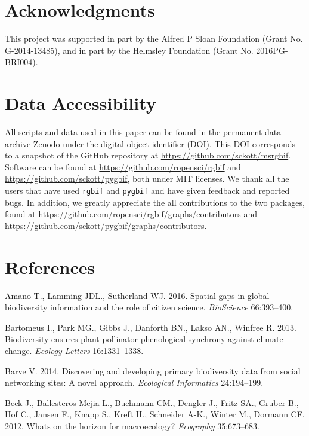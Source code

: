 \documentclass[author-year, review, 11pt]{components/elsarticle} %
\begin{document}
\section{Acknowledgments}\label{acknowledgments}

This project was supported in part by the Alfred P Sloan Foundation
(Grant No. G-2014-13485), and in part by the Helmsley Foundation (Grant
No. 2016PG-BRI004).

\section{Data Accessibility}\label{data-accessibility}

All scripts and data used in this paper can be found in the permanent
data archive Zenodo under the digital object identifier (DOI). This DOI
corresponds to a snapshot of the GitHub repository at
\url{https://github.com/sckott/msrgbif}. Software can be found at
\url{https://github.com/ropensci/rgbif} and
\url{https://github.com/sckott/pygbif}, both under MIT licenses. We
thank all the users that have used \texttt{rgbif} and \texttt{pygbif}
and have given feedback and reported bugs. In addition, we greatly
appreciate the all contributions to the two packages, found at
\url{https://github.com/ropensci/rgbif/graphs/contributors} and
\url{https://github.com/sckott/pygbif/graphs/contributors}.

\section*{References}\label{references}

Amano T., Lamming JDL., Sutherland WJ. 2016. Spatial gaps in global
biodiversity information and the role of citizen science.
\emph{BioScience} 66:393--400.

Bartomeus I., Park MG., Gibbs J., Danforth BN., Lakso AN., Winfree R.
2013. Biodiversity ensures plant-pollinator phenological synchrony
against climate change. \emph{Ecology Letters} 16:1331--1338.

Barve V. 2014. Discovering and developing primary biodiversity data from
social networking sites: A novel approach. \emph{Ecological Informatics}
24:194--199.

Beck J., Ballesteros-Mejia L., Buchmann CM., Dengler J., Fritz SA.,
Gruber B., Hof C., Jansen F., Knapp S., Kreft H., Schneider A-K., Winter
M., Dormann CF. 2012. Whats on the horizon for macroecology?
\emph{Ecography} 35:673--683.
\end{document}
